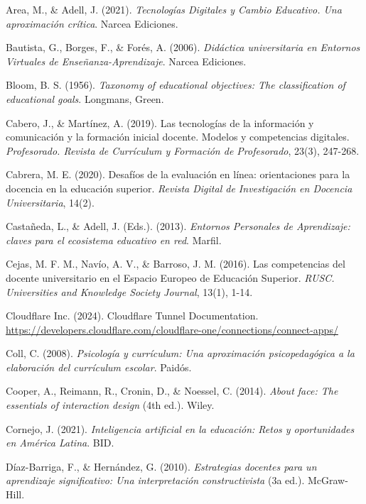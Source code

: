 \documentclass[12pt,a4paper]{report}
\begin{document}
\begin{thebibliography}{99}

Area, M., \& Adell, J. (2021). \textit{Tecnologías Digitales y Cambio Educativo. Una aproximación crítica}. Narcea Ediciones.

Bautista, G., Borges, F., \& Forés, A. (2006). \textit{Didáctica universitaria en Entornos Virtuales de Enseñanza-Aprendizaje}. Narcea Ediciones.

Bloom, B. S. (1956). \textit{Taxonomy of educational objectives: The classification of educational goals}. Longmans, Green.

Cabero, J., \& Martínez, A. (2019). Las tecnologías de la información y comunicación y la formación inicial docente. Modelos y competencias digitales. \textit{Profesorado. Revista de Currículum y Formación de Profesorado}, 23(3), 247-268.

Cabrera, M. E. (2020). Desafíos de la evaluación en línea: orientaciones para la docencia en la educación superior. \textit{Revista Digital de Investigación en Docencia Universitaria}, 14(2).

Castañeda, L., \& Adell, J. (Eds.). (2013). \textit{Entornos Personales de Aprendizaje: claves para el ecosistema educativo en red}. Marfil.

Cejas, M. F. M., Navío, A. V., \& Barroso, J. M. (2016). Las competencias del docente universitario en el Espacio Europeo de Educación Superior. \textit{RUSC. Universities and Knowledge Society Journal}, 13(1), 1-14.

Cloudflare Inc. (2024). Cloudflare Tunnel Documentation. \url{https://developers.cloudflare.com/cloudflare-one/connections/connect-apps/}

Coll, C. (2008). \textit{Psicología y currículum: Una aproximación psicopedagógica a la elaboración del currículum escolar}. Paidós.

Cooper, A., Reimann, R., Cronin, D., \& Noessel, C. (2014). \textit{About face: The essentials of interaction design} (4th ed.). Wiley.

Cornejo, J. (2021). \textit{Inteligencia artificial en la educación: Retos y oportunidades en América Latina}. BID.

Díaz-Barriga, F., \& Hernández, G. (2010). \textit{Estrategias docentes para un aprendizaje significativo: Una interpretación constructivista} (3a ed.). McGraw-Hill.


\end{thebibliography}
\end{document}
